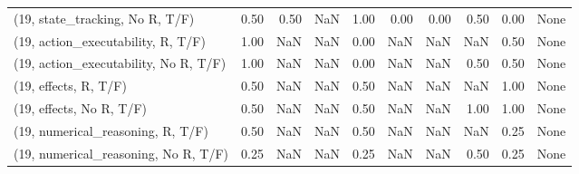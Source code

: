\begin{table*}[h!]
\begin{adjustbox}{width=2\columnwidth,center}
\begin{tabular}{lrrr|rrr|rrr}
(19, state\_tracking, No R, T/F)       &                      0.50 &                  0.50 &                       NaN &                          1.00 &                      0.00 &                          0.00 &                                   0.50 &                               0.00 &                                  None \\
(19, action\_executability, R, T/F)    &                      1.00 &                   NaN &                       NaN &                          0.00 &                       NaN &                           NaN &                                    NaN &                               0.50 &                                  None \\
(19, action\_executability, No R, T/F) &                      1.00 &                   NaN &                       NaN &                          0.00 &                       NaN &                           NaN &                                   0.50 &                               0.50 &                                  None \\
(19, effects, R, T/F)                 &                      0.50 &                   NaN &                       NaN &                          0.50 &                       NaN &                           NaN &                                    NaN &                               1.00 &                                  None \\
(19, effects, No R, T/F)              &                      0.50 &                   NaN &                       NaN &                          0.50 &                       NaN &                           NaN &                                   1.00 &                               1.00 &                                  None \\
(19, numerical\_reasoning, R, T/F)     &                      0.50 &                   NaN &                       NaN &                          0.50 &                       NaN &                           NaN &                                    NaN &                               0.25 &                                  None \\
(19, numerical\_reasoning, No R, T/F)  &                      0.25 &                   NaN &                       NaN &                          0.25 &                       NaN &                           NaN &                                   0.50 &                               0.25 &                                  None \\

\end{tabular}
\end{adjustbox}
\end{table*}
